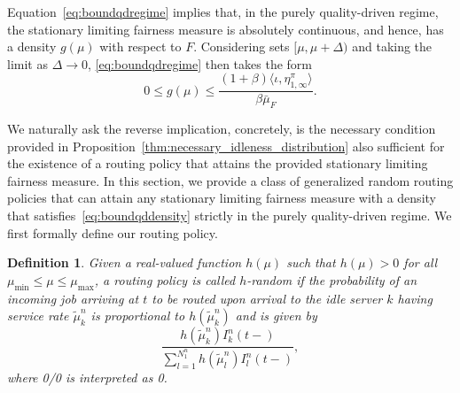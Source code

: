 \documentclass[a4paper,11pt,twoside]{article}
\numberwithin{equation}{section}
\numberwithin{figure}{section}
\theoremstyle{plain}
\newtheorem{definition}[theorem]{Definition}
\newcommand{\1}{\mathbbm{1}}
\begin{document}
Equation~\eqref{eq:boundqdregime} implies that, in the purely quality-driven regime, the stationary limiting fairness measure is absolutely continuous, and hence, has a density $g(\mu)$ with respect to $F$. Considering sets $[\mu,\mu+\Delta)$ and taking the limit as $\Delta\to 0$, \eqref{eq:boundqdregime} then takes the form
\begin{equation}
        0\leq g(\mu)\leq \frac{(1+\beta)\langle \iota, \eta_{1,\infty}^\pi\rangle}{\beta \bar{\mu}_F}.\label{eq:boundqddensity}
\end{equation}

We naturally ask the reverse implication, concretely, is the necessary condition provided in Proposition~\ref{thm:necessary_idleness_distribution} also sufficient for the existence of a routing policy that attains the provided stationary limiting fairness measure. In this section, we provide a class of generalized random routing policies that can attain any stationary limiting fairness measure with a density that satisfies~\eqref{eq:boundqddensity} strictly in the purely quality-driven regime. 
We first formally define our routing policy. 
\begin{definition}
 Given a real-valued function $h(\mu)$ such that $h(\mu)>0$ for all $\mu_{\min}\leq \mu\leq \mu_{\max}$,  a routing policy is called $h$-random if the probability of an incoming job arriving at $t$ to be routed upon arrival to the idle server $k$ having service rate $\tilde{\mu}_k^n$ is proportional to $h(\tilde{\mu}_k^n)$ and is given by 
 \[
 \frac{h(\tilde{\mu}_k^n)I_k^n(t-)}{\sum_{l=1}^{N_1^n}h(\tilde{\mu}_l^n)I_l^n(t-)},
 \]
 where 0/0 is interpreted as 0.
 \end{definition}
    
\end{document}
